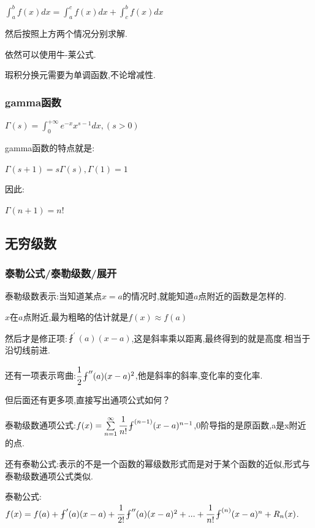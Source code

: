 \documentclass[UTF8,12pt]{ctexbook}
\newcommand{\derivative}{^\prime}
\newcommand{\doubleDerivative}{^{\prime\prime}}
\newcommand{\aLotDerivative}[1]{^{(#1)}}
\newcommand{\upDownSum}[2]{\sum\limits_{#2}^{#1}}
\newcommand{\fDerivative}[1]{\fint\derivative(#1)}
\newcommand{\defFunction}[1]{f(#1)}
\newcommand{\definiteIntegral}[2]{\int^{#1}_{#2}}
\begin{document}
{{{{  $\definiteIntegral{b}{a}\defFunction{x}dx = \definiteIntegral{c}{a}\defFunction{x}dx + \definiteIntegral{b}{c}\defFunction{x}dx$

  然后按照上方两个情况分别求解.

  依然可以使用牛-莱公式.

  瑕积分换元需要为单调函数,不论增减性.

}%

\subsubsection{gamma函数}{
$\varGamma(s) = \definiteIntegral{+\infty}{0}e^{-x}x^{s-1}dx, (s > 0)$

gamma函数的特点就是:

$\varGamma(s + 1) = s\varGamma(s), \varGamma(1) = 1$

因此:

$\varGamma(n+1) = n!$

}%

}%

\subsection{无穷级数}{

\subsubsection{泰勒公式/泰勒级数/展开}{
泰勒级数表示:当知道某点$x = a$的情况时,就能知道$a$点附近的函数是怎样的.

$x$在$a$点附近,最为粗略的估计就是$\defFunction{x} \approx \defFunction{a}$

然后才是修正项:$\fDerivative{a}(x - a)$,这是斜率乘以距离,最终得到的就是高度.相当于沿切线前进.

还有一项表示弯曲:$\cfrac{1}{2}\fint\doubleDerivative(a)(x - a)^2$,他是斜率的斜率,变化率的变化率.

但后面还有更多项,直接写出通项公式如何？

泰勒级数通项公式:$\defFunction{x} = \upDownSum{\infty}{n = 1}\cfrac{1}{n!}\fint\aLotDerivative{n - 1}(x - a)^{n - 1}$,0阶导指的是原函数,a是x附近的点.

还有泰勒公式:表示的不是一个函数的幂级数形式而是对于某个函数的近似,形式与泰勒级数通项公式类似.

泰勒公式:$\defFunction{x} = \defFunction{a} + \fDerivative{a}(x - a) + \cfrac{1}{2!}\fint\doubleDerivative(a)(x - a)^2 + ... + \cfrac{1}{n!}\fint\aLotDerivative{n}(x - a)^n + R_n(x)$.

}}}}
\end{document}
